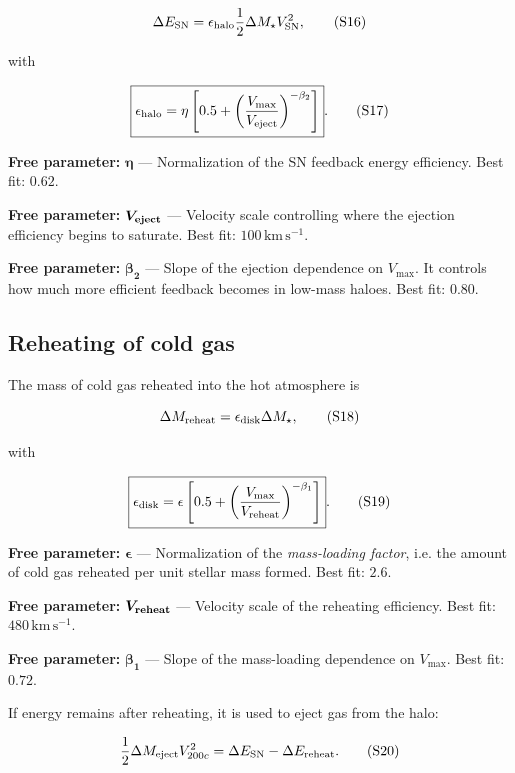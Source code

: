 \documentclass[11pt,a4paper]{article}
\newcommand{\freeparam}[2]{%
  \colorbox{freeblue}{\parbox{0.95\linewidth}{\textbf{Free parameter:} $\boldsymbol{#1}$ --- #2}}%
}
\begin{document}
\begin{equation}
 \Delta E_{\rm SN}=\epsilon_{\rm halo}\frac{1}{2}\Delta M_\star V_{\rm SN}^2,
 \tag{S16}
\end{equation}

with

\begin{equation}
 \boxed{\epsilon_{\rm halo}=\eta\left[
 0.5+\left(\frac{V_{\max}}{V_{\rm eject}}\right)^{-\beta_2}
 \right]}.
 \tag{S17}
\end{equation}

\freeparam{\eta}{Normalization of the SN feedback energy efficiency. Best fit: $0.62$.}

\freeparam{V_{\rm eject}}{Velocity scale controlling where the ejection efficiency begins to saturate. Best fit: $100\,\mathrm{km\,s^{-1}}$.}

\freeparam{\beta_2}{Slope of the ejection dependence on $V_{\max}$. It controls how much more efficient feedback becomes in low-mass haloes. Best fit: $0.80$.}

\subsection{Reheating of cold gas}
The mass of cold gas reheated into the hot atmosphere is

\begin{equation}
 \Delta M_{\rm reheat}=\epsilon_{\rm disk}\Delta M_\star,
 \tag{S18}
\end{equation}

with

\begin{equation}
 \boxed{\epsilon_{\rm disk}=\epsilon\left[
 0.5+\left(\frac{V_{\max}}{V_{\rm reheat}}\right)^{-\beta_1}
 \right]}.
 \tag{S19}
\end{equation}

\freeparam{\epsilon}{Normalization of the \textit{mass-loading factor}, i.e. the amount of cold gas reheated per unit stellar mass formed. Best fit: $2.6$.}

\freeparam{V_{\rm reheat}}{Velocity scale of the reheating efficiency. Best fit: $480\,\mathrm{km\,s^{-1}}$.}

\freeparam{\beta_1}{Slope of the mass-loading dependence on $V_{\max}$. Best fit: $0.72$.}

If energy remains after reheating, it is used to eject gas from the halo:

\begin{equation}
 \frac{1}{2}\Delta M_{\rm eject}V_{200c}^2
 =\Delta E_{\rm SN}-\Delta E_{\rm reheat}.
 \tag{S20}
\end{equation}
\end{document}
